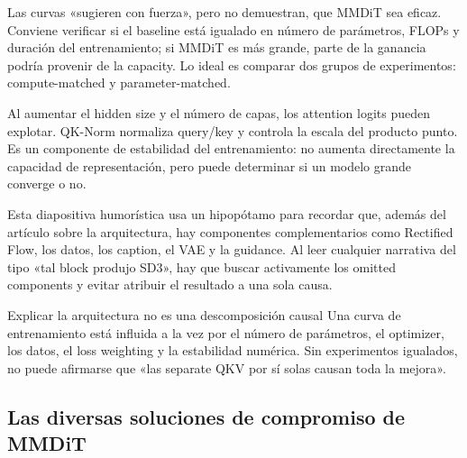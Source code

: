 
Las curvas «sugieren con fuerza», pero no demuestran, que MMDiT sea eficaz. Conviene verificar si el baseline está igualado en número de parámetros, FLOPs y duración del entrenamiento; si MMDiT es más grande, parte de la ganancia podría provenir de la capacity. Lo ideal es comparar dos grupos de experimentos: compute-matched y parameter-matched.


Al aumentar el hidden size y el número de capas, los attention logits pueden explotar. QK-Norm normaliza query/key y controla la escala del producto punto. Es un componente de estabilidad del entrenamiento: no aumenta directamente la capacidad de representación, pero puede determinar si un modelo grande converge o no.


Esta diapositiva humorística usa un hipopótamo para recordar que, además del artículo sobre la arquitectura, hay componentes complementarios como Rectified Flow, los datos, los caption, el VAE y la guidance. Al leer cualquier narrativa del tipo «tal block produjo SD3», hay que buscar activamente los omitted components y evitar atribuir el resultado a una sola causa.


\begin{warningbox}{Explicar la arquitectura no es una descomposición causal}
Una curva de entrenamiento está influida a la vez por el número de parámetros, el optimizer, los datos, el loss weighting y la estabilidad numérica. Sin experimentos igualados, no puede afirmarse que «las separate QKV por sí solas causan toda la mejora».
\end{warningbox}

\subsection{Las diversas soluciones de compromiso de MMDiT}

